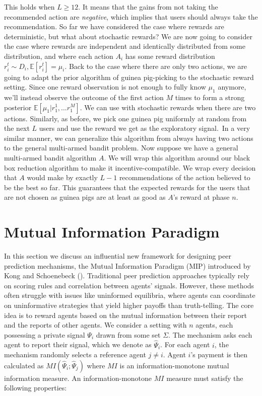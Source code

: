 \documentclass[
  letterpaper,
  numbers=noenddot,
  DIV=11]{scrreprt}
\theoremstyle{definition}
\theoremstyle{plain}
\theoremstyle{plain}
\theoremstyle{remark}
\begin{document}
This holds when \(L \geq 12\). It means that the gains from not taking
the recommended action are \emph{negative}, which implies that users
should always take the recommendation. So far we have considered the
case where rewards are deterministic, but what about stochastic rewards?
We are now going to consider the case where rewards are independent and
identically distributed from some distribution, and where each action
\(A_i\) has some reward distribution
\(r_i^t \sim D_i, \mathbb{E}[r_i^t] = \mu_i\). Back to the case where
there are only two actions, we are going to adapt the prior algorithm of
guinea pig-picking to the stochastic reward setting. Since one reward
observation is not enough to fully know \(\mu_1\) anymore, we'll instead
observe the outcome of the first action \(M\) times to form a strong
posterior \(\mathbb{E}[\mu_1 | r_1^1, \ldots r_1^M]\). We can use with
stochastic rewards when there are two actions. Similarly, as before, we
pick one guinea pig uniformly at random from the next \(L\) users and
use the reward we get as the exploratory signal.~In a very similar
manner, we can generalize this algorithm from always having two actions
to the general multi-armed bandit problem. Now suppose we have a general
multi-armed bandit algorithm \(A\). We will wrap this algorithm around
our black box reduction algorithm to make it incentive-compatible. We
wrap every decision that \(A\) would make by exactly \(L-1\)
recommendations of the action believed to be the best so far. This
guarantees that the expected rewards for the users that are not chosen
as guinea pigs are at least as good as \(A\)'s reward at phase \(n\).

\section{Mutual Information Paradigm}\label{mutual-information-paradigm}

In this section we discuss an influential new framework for designing
peer prediction mechanisms, the Mutual Information Paradigm (MIP)
introduced by Kong and Schoenebeck
().
Traditional peer prediction approaches typically rely on scoring rules
and correlation between agents' signals. However, these methods often
struggle with issues like uninformed equilibria, where agents can
coordinate on uninformative strategies that yield higher payoffs than
truth-telling. The core idea is to reward agents based on the mutual
information between their report and the reports of other agents. We
consider a setting with \(n\) agents, each possessing a private signal
\(\Psi_i\) drawn from some set \(\Sigma\). The mechanism asks each agent
to report their signal, which we denote as \(\hat{\Psi}_i\). For each
agent \(i\), the mechanism randomly selects a reference agent
\(j \neq i\). Agent \(i\)'s payment is then calculated as
\(MI(\hat{\Psi}_i; \hat{\Psi}_j)\) where \(MI\) is an
information-monotone mutual information measure. An information-monotone
\(MI\) measure must satisfy the following properties:
\end{document}
